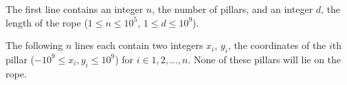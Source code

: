 

The first line contains an integer $n$, the number of pillars, and an integer $d$, the length of the rope 
($1 \leq n \leq 10^5$, $1 \leq d \leq 10^9$).

The following $n$ lines each contain two integers $x_i$, $y_i$, the coordinates of the
$i$th pillar ($-10^9 \leq x_i, y_i \leq 10^9$) for $i \in 1, 2, \ldots, n$. None of these pillars will lie on the rope.


